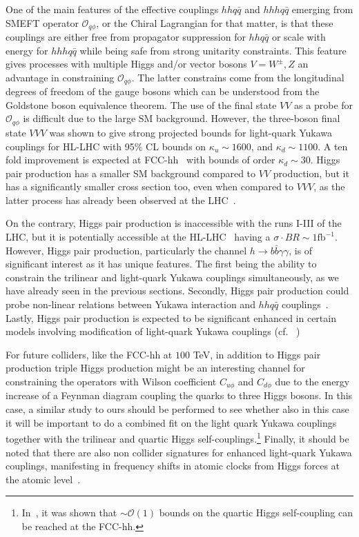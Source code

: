 One of the main features of the effective couplings $hh q\bar q$ and $hhh q\bar q$ emerging from SMEFT operator $\mathcal O_{q\phi}$, or the Chiral Lagrangian for that matter, is that these couplings are either free from propagator suppression for $hh q\bar q$ or scale with energy for $hhh q\bar q$ while being safe from strong unitarity constraints. This feature gives processes with multiple Higgs and/or vector bosons $V= W^\pm, Z$ an advantage in constraining $\mathcal O_{q\phi}$. The latter constrains come from the longitudinal degrees of freedom of the gauge bosons  which can be understood from the Goldstone boson equivalence theorem. The use of the final state $VV$ as a probe for $\mathcal O_{q\phi}$ is difficult due to the large SM background. However, the three-boson final state $VVV$ was shown to give strong projected bounds for light-quark Yukawa couplings for HL-LHC with 95\% CL bounds on $\kappa_u \sim 1600$, and $\kappa_d\sim 1100$. A ten fold improvement is expected at FCC-hh~\cite{Falkowski:2020znk} with bounds of order $\kappa_d\sim 30$. 
Higgs pair production has a smaller SM background compared to $VV$ production, but it has a significantly smaller cross section too, even when compared to $VVV$, as the latter process has already been observed at the LHC~\cite{Sciandra:2688061,CMS-PAS-SMP-19-014}.

On the contrary, Higgs pair production is inaccessible with the runs I-III of the LHC, but it is potentially accessible at the HL-LHC~\cite{Binoth:2006ym} having a $ \sigma \cdot BR\sim 1\mathrm{fb}^{-1}$. However, Higgs pair production, particularly the channel $h \to b \bar b \gamma \gamma $, is of significant interest as it has unique features. The first being the ability to constrain the trilinear and light-quark Yukawa couplings simultaneously, as we have already seen in the previous sections. Secondly, Higgs pair production could probe non-linear relations between Yukawa interaction and $hh q\bar q$ couplings~\cite{Contino:2012xk}. Lastly, Higgs pair production is expected to be significant enhanced in certain models involving modification of light-quark Yukawa couplings (cf. ~\cite{Bar-Shalom:2018rjs,Bauer:2017cov,Egana-Ugrinovic:2021uew})

For future colliders, like the FCC-hh at $100$ TeV, in addition to Higgs pair production triple Higgs production might be an interesting channel for constraining the operators with Wilson coefficient $C_{u\phi}$ and $C_{d\phi}$ due to the energy increase of a Feynman diagram coupling the quarks to three Higgs bosons.   In this case, a similar study to ours should be performed to see whether also in this case it will be important to do a combined fit on the light quark Yukawa couplings together with the trilinear and quartic Higgs self-couplings.\footnote{In~\cite{Papaefstathiou:2047255}, it was shown that $\sim \mathcal{O}(1)$ bounds on the quartic Higgs self-coupling can be reached at the FCC-hh.}
Finally, it should be noted that there are also non collider signatures for enhanced light-quark Yukawa couplings, manifesting in frequency shifts in atomic clocks from Higgs forces at the atomic level~\cite{Delaunay:2016brc}. 
